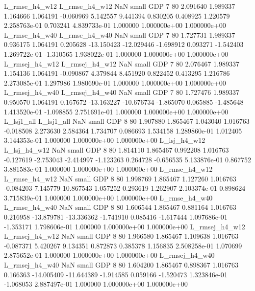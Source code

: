  L_rmse_h4_w12  L_rmse_h4_w12                   NaN      small      GDP                 7 80 2.091640       1.989337 1.164666       1.064191   -0.060969      5.142557      9.441394     0.830205       0.408925  1.220579 2.258763e-01     0.703241   4.839733e-01            1.000000    1.000000e+00        1.000000e+00
 L_rmse_h4_w40  L_rmse_h4_w40                   NaN      small      GDP                 7 80 1.727731       1.989337 0.936175       1.064191    0.205628    -13.150423    -12.029446    -1.698912       0.093271 -1.542403 1.269722e-01    -1.310565   1.938022e-01            1.000000    1.000000e+00        1.000000e+00
L_rmsej_h4_w12 L_rmsej_h4_w12                   NaN      small      GDP                 7 80 2.076467       1.989337 1.154136       1.064191   -0.090867      4.379844      8.451920     0.822452       0.413295  1.216786 2.273085e-01     1.297986   1.980690e-01            1.000000    1.000000e+00        1.000000e+00
L_rmsej_h4_w40 L_rmsej_h4_w40                   NaN      small      GDP                 7 80 1.727476       1.989337 0.950570       1.064191    0.167672    -13.163227    -10.676734    -1.865070       0.065885 -1.485648 1.413520e-01    -1.098855   2.751691e-01            1.000000    1.000000e+00        1.000000e+00
    L_lsj1_all     L_lsj1_all                   NaN      small      GDP                 8 80 1.907880       1.865467 1.043040       1.016763   -0.018508      2.273630      2.584364     1.734707       0.086693  1.534158 1.289860e-01     1.012405   3.144353e-01            1.000000    1.000000e+00        1.000000e+00
  L_lsj_h4_w12   L_lsj_h4_w12                   NaN      small      GDP                 8 80 1.814110       1.865467 0.992208       1.016763   -0.127619     -2.753043     -2.414997    -1.123263       0.264728 -0.656535 5.133876e-01     0.867752   3.881583e-01            1.000000    1.000000e+00        1.000000e+00
 L_rmse_h4_w12  L_rmse_h4_w12                   NaN      small      GDP                 8 80 1.998769       1.865467 1.127260       1.016763   -0.084203      7.145779     10.867543     1.057252       0.293619  1.262907 2.103374e-01     0.898624   3.715839e-01            1.000000    1.000000e+00        1.000000e+00
 L_rmse_h4_w40  L_rmse_h4_w40                   NaN      small      GDP                 8 80 1.606544       1.865467 0.881164       1.016763    0.216958    -13.879781    -13.336362    -1.741910       0.085416 -1.617444 1.097686e-01    -1.353171   1.798606e-01            1.000000    1.000000e+00        1.000000e+00
L_rmsej_h4_w12 L_rmsej_h4_w12                   NaN      small      GDP                 8 80 1.966580       1.865467 1.109638       1.016763   -0.087371      5.420267      9.134351     0.872873       0.385378  1.156835 2.508258e-01     1.070699   2.875652e-01            1.000000    1.000000e+00        1.000000e+00
L_rmsej_h4_w40 L_rmsej_h4_w40                   NaN      small      GDP                 8 80 1.604200       1.865467 0.898367       1.016763    0.166363    -14.005409    -11.644389    -1.914585       0.059166 -1.520473 1.323846e-01    -1.068053   2.887497e-01            1.000000    1.000000e+00        1.000000e+00